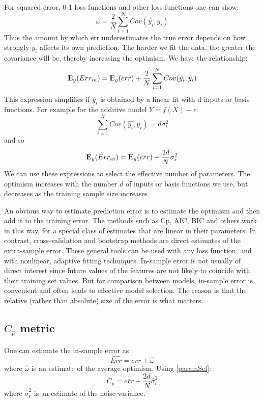 \documentclass[12pt, letterpaper]{article}
\theoremstyle{definition}
\newcommand{\E}{{\rm I\kern-.3em E}}
\begin{document}
For squared error, 0-1 loss functions and other loss functions one can show:
\begin{equation}
\omega = \frac{2}{N} \sum_{i=1}^N Cov(\hat{y_i}, y_i)
\end{equation}
Thus the amount by which err underestimates the true error depends on how strongly $y_i$ affects its own prediction. The harder we fit the data, the greater the covariance will be, thereby increasing the optimism. We have the relationship:
\begin{equation}
\E_y (Err_{in}) = \E_y(\bar{err}) +\frac{2}{N} \sum_{i=1}^N Cov(\hat{y_i}, y_i)
\end{equation}
This expression simplifies if $\hat{y}_i$ is obtained by a linear fit with d inputs or basis functions. For example for the additive model $Y=f(X) + \epsilon$:
\begin{equation}
 \sum_{i=1}^N Cov(\hat{y_i}, y_i) = d\sigma_\epsilon^2
\end{equation}
and so
\begin{equation}
\E_y (Err_{in}) = \E_y(\bar{err}) +\frac{2d}{N} \sigma_\epsilon^2
\label{paramSel}
\end{equation}
We can use these expressions to select the effective number of parameters. The optimism increases with the number $d$ of inputs or basis functions we use, but decreases as the training sample size increases

An obvious way to estimate prediction error is to estimate the optimism and then add it to the training error. The methods such as Cp, AIC, BIC and others work in this way, for a special class of estimates that are linear in their parameters.
In contrast, cross-validation and bootstrap methods are direct estimates of the extra-sample error. These general tools can be used with any loss function, and with nonlinear, adaptive fitting techniques.
In-sample error is not usually of direct interest since future values of the features are not likely to coincide with their training set values. But for comparison between models, in-sample error is convenient and often leads to effective model selection. The reason is that the relative (rather than absolute) size of the error is what matters.

\subsection{$C_p$ metric}
One can estimate the in-sample error as
\begin{equation}
\hat{Err} = \bar{err}+\hat{\omega}
\end{equation}
where $\hat{\omega}$ is an estimate of the average optimism. Using \ref{paramSel}:
\begin{equation}
C_p = \bar{err} +\frac{2d}{N} \hat{\sigma}_\epsilon^2
\end{equation}
where $\hat{\sigma}_\epsilon^2$ is an estimate of the noise variance.
\end{document}

